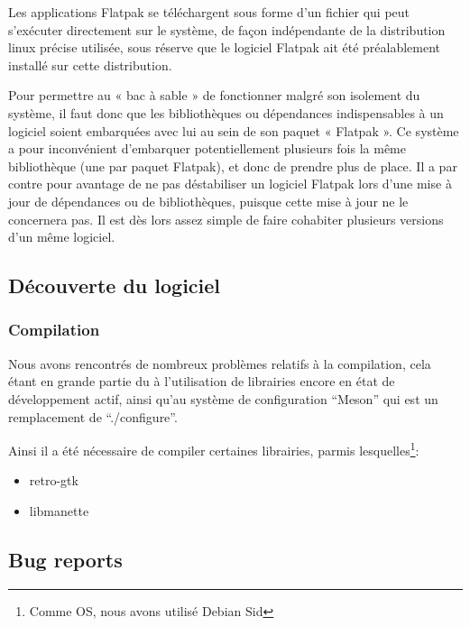 \documentclass[12pt]{report}
\begin{document}
Les applications Flatpak se téléchargent sous forme d'un fichier qui
peut s’exécuter directement sur le système, de façon indépendante de
la distribution linux précise utilisée, sous réserve que le logiciel
Flatpak ait été préalablement installé sur cette distribution.

Pour permettre au « bac à sable » de fonctionner malgré son isolement
du système, il faut donc que les bibliothèques ou dépendances
indispensables à un logiciel soient embarquées avec lui au sein de son
paquet « Flatpak ». Ce système a pour inconvénient d'embarquer
potentiellement plusieurs fois la même bibliothèque (une par paquet
Flatpak), et donc de prendre plus de place. Il a par contre pour
avantage de ne pas déstabiliser un logiciel Flatpak lors d'une mise à
jour de dépendances ou de bibliothèques, puisque cette mise à jour ne
le concernera pas. Il est dès lors assez simple de faire cohabiter
plusieurs versions d'un même logiciel.

\subsection{Découverte du logiciel}
\subsubsection{Compilation}
Nous avons rencontrés de nombreux problèmes relatifs à la compilation,
cela étant en grande partie du à l'utilisation de librairies encore en
état de développement actif, ainsi qu'au système de configuration
``Meson'' qui est un remplacement de ``./configure''.

Ainsi il a été nécessaire de compiler certaines librairies, parmis
lesquelles\footnote{Comme OS, nous avons utilisé Debian Sid}:
\begin{itemize}
\item retro-gtk
\item libmanette
\end{itemize}


\subsection{Bug reports}
\end{document}
